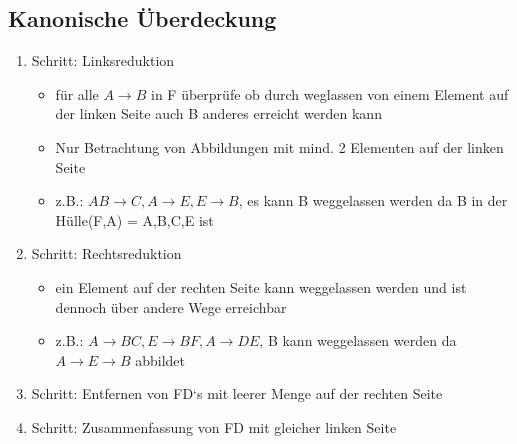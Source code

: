 \documentclass[a4paper]{article}
\begin{document}
\subsection{Kanonische Überdeckung}
\begin{enumerate}
    \item Schritt: Linksreduktion
    \begin{itemize}
        \item für alle $A \rightarrow B$ in F überprüfe ob durch weglassen von einem Element auf der linken Seite auch B anderes erreicht werden kann
        \item Nur Betrachtung von Abbildungen mit mind. 2 Elementen auf der linken Seite
        \item z.B.: $AB \rightarrow C, A \rightarrow E, E \rightarrow B$, es kann B weggelassen werden da B in der Hülle(F,A) = {A,B,C,E} ist 
    \end{itemize}
    
    \item Schritt: Rechtsreduktion
    \begin{itemize}
        \item ein Element auf der rechten Seite kann weggelassen werden und ist dennoch über andere Wege erreichbar
        \item z.B.: $A \rightarrow BC, E \rightarrow BF, A \rightarrow DE$, B kann weggelassen werden da $A \rightarrow E \rightarrow B$ abbildet
    \end{itemize}
    \item Schritt: Entfernen von FD‘s mit leerer Menge auf der rechten Seite
    \item Schritt: Zusammenfassung von FD mit gleicher linken Seite
\end{enumerate}
\end{document}
